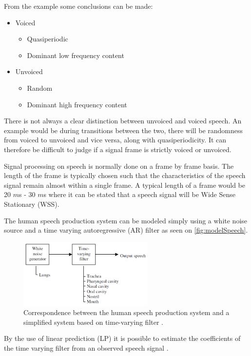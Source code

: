 \newpage

From the example some conclusions can be made:
\begin{itemize}
\item Voiced
	\begin{itemize}
	\item Quasiperiodic
	\item Dominant low frequency content
	\end{itemize}
\item Unvoiced
	\begin{itemize}
	\item Random 
	\item Dominant high frequency content
	\end{itemize}
\end{itemize}


There is not always a clear distinction between unvoiced and voiced speech. An example would be during transitions between the two, there will be randomness from voiced to unvoiced and vice versa, along with quasiperiodicity. It can therefore be difficult to judge if a signal frame is strictly voiced or unvoiced. 

Signal processing on speech is normally done on a frame by frame basis. The length of the frame is typically chosen such that the characteristics of the speech signal remain almost within a single frame. A typical length of a frame would be 20 $m$s - 30 $m$s where it can be stated that a speech signal will be Wide Sense Stationary (WSS).  

The human speech production system can be modeled simply using a white noise source and a time varying autoregressive (AR) filter as seen on \autoref{fig:modelSpeech}. 

\begin{figure}[H]
	\centering
	\includegraphics[width=0.6\textwidth]{figures/Speech/modelSpeech}
	\caption{Correspondence between the human speech production system and a simplified system based on time-varying filter \citep{Speech}.}
	\label{fig:modelSpeech}
\end{figure}      

By the use of linear prediction (LP) it is possible to estimate the coefficients of the time varying filter from an observed speech signal 
\citep{Speech}.


